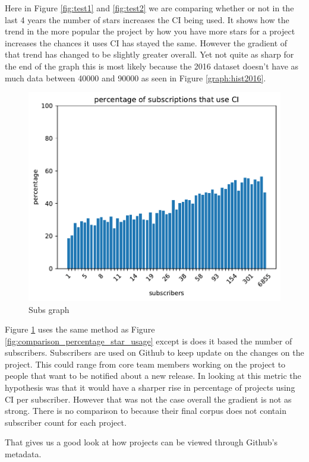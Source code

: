 \documentclass[twoside,12pt,titlepage,a4paper]{article}
\begin{document}
Here in Figure \ref{fig:test1} and \ref{fig:test2} we are comparing whether or not in the last 4 years the number of stars increases the CI being used. It shows how the trend in the more popular the project by how you have more stars for a project increases the chances it uses CI has stayed the same. However the gradient of that trend has changed to be slightly greater overall. Yet not quite as sharp for the end of the graph this is most likely because the 2016 dataset doesn't have as much data between 40000 and 90000 as seen in Figure \ref{graph:hist2016}.

\begin{figure}[!h]
  \centering
  \includegraphics[width=.8\textwidth]{../src/results/percentage sub with CI.pdf}
  \caption{Subs graph}
  \label{graph_percentage_subs}
\end{figure}
Figure \ref{graph_percentage_subs} uses the same method as Figure \ref{fig:comparison_percentage_star_usage} except is does it based the number of subscribers. Subscribers are used on Github to keep update on the changes on the project. This could range from core team members working on the project to people that want to be notified about a new release. 
In looking at this metric the hypothesis was that it would have a sharper rise in percentage of projects using CI per subscriber. However that was not the case overall the gradient is not as strong. There is no comparison to \cite{Hilton2016} because their final corpus does not contain subscriber count for each project.

That gives us a good look at how projects can be viewed through Github's metadata. 
\end{document}
